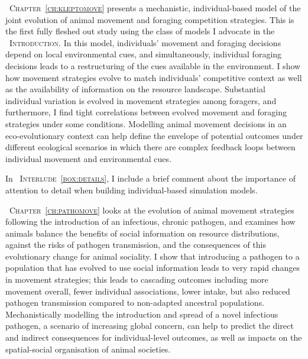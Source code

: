 {\scshape~Chapter~\ref{ch:kleptomove}} presents a mechanistic, individual-based model of the joint evolution of animal movement and foraging competition strategies.
This is the first fully fleshed out study using the class of models I advocate in the {\scshape~Introduction}.
In this model, individuals' movement and foraging decisions depend on local environmental cues, and simultaneously, individual foraging decisions leads to a restructuring of the cues available in the environment.
I show how movement strategies evolve to match individuals' competitive context as well as the availability of information on the resource landscape.
Substantial individual variation is evolved in movement strategies among foragers, and furthermore, I find tight correlations between evolved movement and foraging strategies under some conditions.
Modelling animal movement decisions in an eco-evolutionary context can help define the envelope of potential outcomes under different ecological scenarios in which there are complex feedback loops between individual movement and environmental cues.

\medskip

\noindent In {\scshape~Interlude~\ref{box:details}}, I include a brief comment about the importance of attention to detail when building individual-based simulation models.

\medskip

{\scshape~Chapter~\ref{ch:pathomove}} looks at the evolution of animal movement strategies following the introduction of an infectious, chronic pathogen, and examines how animals balance the benefits of social information on resource distributions, against the risks of pathogen transmission, and the consequences of this evolutionary change for animal sociality.
I show that introducing a pathogen to a population that has evolved to use social information leads to very rapid changes in movement strategies; this leads to cascading outcomes including more movement overall, fewer individual associations, lower intake, but also reduced pathogen transmission compared to non-adapted ancestral populations.
Mechanistically modelling the introduction and spread of a novel infectious pathogen, a scenario of increasing global concern, can help to predict the direct and indirect consequences for individual-level outcomes, as well as impacts on the spatial-social organisation of animal societies.

\medskip

